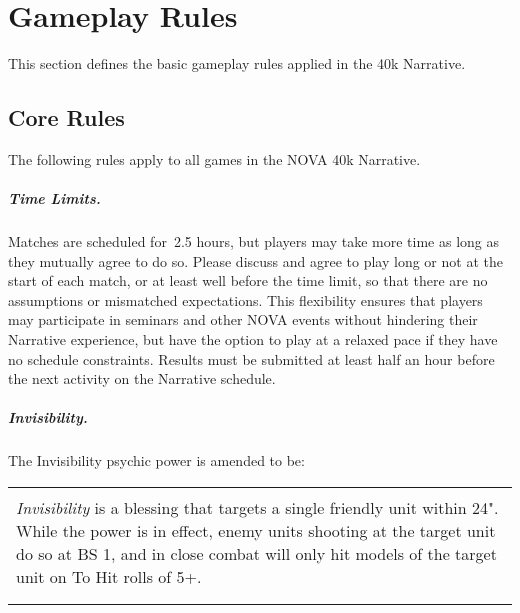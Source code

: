 \makeatletter\@openrightfalse
\chapter{Gameplay Rules}
\@openrighttrue\makeatother

This section defines the basic gameplay rules applied in the 40k Narrative.

\section{Core Rules}

The following rules apply to all games in the NOVA 40k Narrative.

\paragraph{Time Limits.}
Matches are scheduled for~2.5 hours, but players may take more time as
long as they mutually agree to do so.  Please discuss and agree to
play long or not at the start of each match, or at least well before
the time limit, so that there are no assumptions or mismatched
expectations.  This flexibility ensures that players may participate
in seminars and other NOVA events without hindering their Narrative
experience, but have the option to play at a relaxed pace if they have
no schedule constraints.  Results must be submitted at least half an
hour before the next activity on the Narrative schedule.

\paragraph{Invisibility.}
The Invisibility psychic power is amended to be:

\begin{center}  
\begin{tabular}{L{6in}}
\hline\\
  \emph{Invisibility} is a blessing that targets a single friendly unit
  within 24". While the power is in effect, enemy units shooting at the
  target unit do so at BS 1, and in close combat will only hit models of
  the target unit on To Hit rolls of 5+.\\
\\
\hline\\
\end{tabular}
\end{center}

